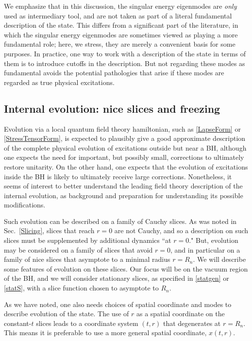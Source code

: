 \documentclass[12pt]{article}
\numberwithin{equation}{section}
\begin{document}
We emphasize that in this discussion, the singular energy eigenmodes are {\it only} used as intermediary tool, and are not taken as part of a literal fundamental description of the state.  
This differs from a significant part of the literature, in which the singular energy eigenmodes are sometimes viewed as playing a more fundamental role; here, we stress, they are merely a convenient basis for some purposes.  In practice, one way to work with a description of the state in terms of them is to introduce cutoffs in the description.  
But not  regarding these modes as fundamental  avoids the potential pathologies that arise if these modes are regarded as true physical excitations.  
 
 

\subsection{Internal evolution: nice slices and freezing}

Evolution via a local quantum field theory hamiltonian, such as \eqref{LapseForm} or \eqref{StressTensorForm}, is expected to plausibly give a good approximate description of the complete physical evolution of excitations outside but near a BH, although one expects the need for important, but possibly small,  corrections to ultimately restore unitarity\cite{SGmodels,BHQIUE,NVNL,NVU,BHQU}.  On the other hand, one expects that the evolution of excitations inside the BH is likely to ultimately receive large corrections.  Nonetheless, it seems of interest to better understand the leading field theory description of the internal evolution, as background and preparation for understanding its possible modifications.

Such evolution can be described on a family of Cauchy slices.  As was noted in Sec.~\ref{Slicing}, slices that reach $r=0$ are not Cauchy, and so a description on such slices must be supplemented by additional dynamics ``at $r=0$."  But, evolution may be considered on a family of slices that avoid $r=0$, and in particular on a family of nice slices that asymptote to a minimal radius $r=R_n$.  We will describe some features of evolution on these slices.  Our focus will be on the vacuum region of the BH, and we will consider stationary slices, as specified in \eqref{statgen} or \eqref{statS}, with a slice function chosen to asymptote to $R_n$. 

As we have noted, one also needs choices of spatial coordinate and modes to describe evolution of the state.  The use of $r$ as a spatial coordinate on the constant-$t$ slices leads to a coordinate system $(t,r)$ that degenerates at $r=R_n$.  This means it is preferable to use a more general spatial coordinate, $x(t,r)$.  
\end{document}

